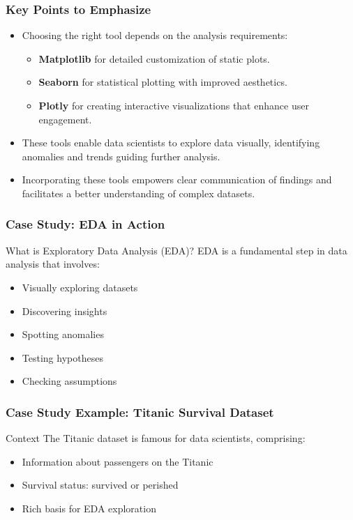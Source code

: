 \documentclass[aspectratio=169]{beamer}
\begin{document}
\begin{frame}
    \frametitle{Key Points to Emphasize}
    \begin{itemize}
        \item Choosing the right tool depends on the analysis requirements:
        \begin{itemize}
            \item \textbf{Matplotlib} for detailed customization of static plots.
            \item \textbf{Seaborn} for statistical plotting with improved aesthetics.
            \item \textbf{Plotly} for creating interactive visualizations that enhance user engagement.
        \end{itemize}
        \item These tools enable data scientists to explore data visually, identifying anomalies and trends guiding further analysis.
        \item Incorporating these tools empowers clear communication of findings and facilitates a better understanding of complex datasets.
    \end{itemize}
\end{frame}

\begin{frame}[fragile]
    \frametitle{Case Study: EDA in Action}
    \begin{block}{What is Exploratory Data Analysis (EDA)?}
        EDA is a fundamental step in data analysis that involves:
        \begin{itemize}
            \item Visually exploring datasets 
            \item Discovering insights 
            \item Spotting anomalies 
            \item Testing hypotheses 
            \item Checking assumptions
        \end{itemize}
    \end{block}
\end{frame}

\begin{frame}[fragile]
    \frametitle{Case Study Example: Titanic Survival Dataset}
    \begin{block}{Context}
        The Titanic dataset is famous for data scientists, comprising:
        \begin{itemize}
            \item Information about passengers on the Titanic
            \item Survival status: survived or perished
            \item Rich basis for EDA exploration
        \end{itemize}
    \end{block}
\end{frame}
\end{document}
